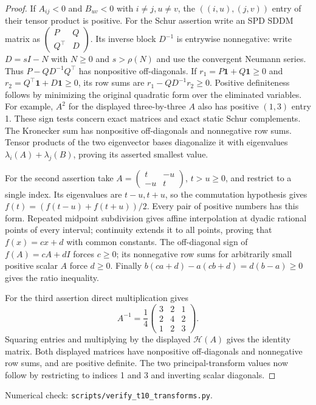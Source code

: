 \documentclass[11pt]{article}
\newcommand{\ind}{\mathbf 1}
\begin{document}
\begin{proof}
If $A_{ij}<0$ and $B_{uv}<0$ with $i\ne j,u\ne v$, the
$((i,u),(j,v))$ entry of their tensor product is positive.
For the Schur assertion write an SPD SDDM matrix as
$\left(\begin{smallmatrix}P&Q\\Q^\top&D\end{smallmatrix}\right)$.
Its inverse block $D^{-1}$ is entrywise nonnegative: write
$D=sI-N$ with $N\geq0$ and $s>\rho(N)$ and use the convergent
Neumann series. Thus $P-QD^{-1}Q^\top$ has nonpositive
off-diagonals. If $r_1=P\ind+Q\ind\geq0$ and
$r_2=Q^\top\ind+D\ind\geq0$, its row sums are
$r_1-QD^{-1}r_2\geq0$. Positive definiteness follows by minimizing
the original quadratic form over the eliminated variables.
For example, $A^2$ for the displayed three-by-three $A$ also has
positive $(1,3)$ entry 1. These sign tests concern exact matrices
and exact static Schur complements. The Kronecker sum has
nonpositive off-diagonals and nonnegative row sums. Tensor products
of the two eigenvector bases diagonalize it with eigenvalues
$\lambda_i(A)+\lambda_j(B)$, proving its asserted smallest value.

For the second assertion take
$A=\left(\begin{smallmatrix}t&-u\\-u&t\end{smallmatrix}\right)$,
$t>u\geq0$, and restrict to a single index. Its eigenvalues are
$t-u,t+u$, so the commutation hypothesis gives
$f(t)=(f(t-u)+f(t+u))/2$. Every pair of positive numbers has this
form. Repeated midpoint subdivision gives affine interpolation
at dyadic rational points of every interval; continuity extends
it to all points, proving that $f(x)=cx+d$ with common constants.
The off-diagonal sign of $f(A)=cA+dI$ forces $c\geq0$; its
nonnegative row sums for arbitrarily small positive scalar $A$
force $d\geq0$. Finally
$b(ca+d)-a(cb+d)=d(b-a)\geq0$ gives the ratio inequality.

For the third assertion direct multiplication gives
\[
 A^{-1}=\frac14\begin{pmatrix}3&2&1\\2&4&2\\1&2&3\end{pmatrix}.
\]
Squaring entries and multiplying by the displayed $\mathcal H(A)$
gives the identity matrix. Both displayed matrices have
nonpositive off-diagonals and nonnegative row sums, and are
positive definite. The two principal-transform values now follow
by restricting to indices 1 and 3 and inverting scalar diagonals.
\end{proof}
\noindent Numerical check: \texttt{scripts/verify\_t10\_transforms.py}.
\end{document}
